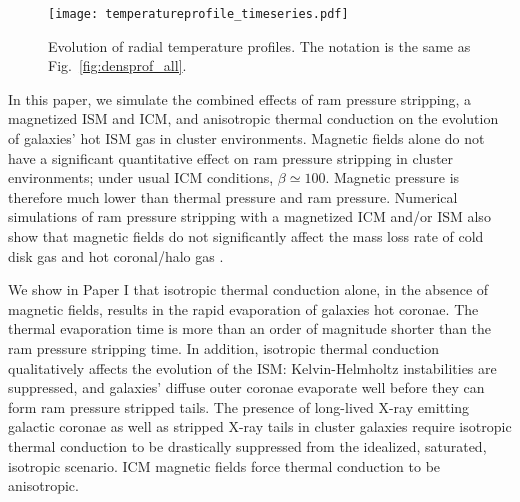\documentclass[twocolumn]{aastex6}
\begin{document}
\begin{figure*}[!htbp]
  \begin{center}
    {\texttt{[image: temperatureprofile\_timeseries.pdf]}}
     \caption{Evolution of radial temperature profiles. The notation is the same as Fig.~\ref{fig:densprof_all}.
      \label{fig:tempprof_all}}
  \end{center}  
\end{figure*}

In this paper, we simulate the combined effects of ram pressure stripping, a magnetized ISM and ICM, and anisotropic thermal conduction on the evolution of galaxies' hot ISM gas in cluster environments. Magnetic fields alone do not have a significant quantitative effect on ram pressure stripping in cluster environments; under usual ICM conditions, $\beta \simeq 100$. Magnetic pressure is therefore much lower than thermal pressure and ram pressure. Numerical simulations of ram pressure stripping with a magnetized ICM and/or ISM also show that magnetic fields do not significantly affect the mass loss rate of cold disk gas \citep{Ruszkowski14,Tonnesen14} and hot coronal/halo gas \citep{Shin14,Vijayaraghavan17a}. 

We show in Paper I that isotropic thermal conduction alone, in the absence of magnetic fields, results in the rapid evaporation of galaxies hot coronae. The thermal evaporation time is more than an order of magnitude shorter than the ram pressure stripping time. In addition, isotropic thermal conduction qualitatively affects the evolution of the ISM: Kelvin-Helmholtz instabilities are suppressed, and galaxies' diffuse outer coronae evaporate well before they can form ram pressure stripped tails. The presence of long-lived X-ray emitting galactic coronae as well as stripped X-ray tails in cluster galaxies require isotropic thermal conduction to be drastically suppressed from the idealized, saturated, isotropic scenario. ICM magnetic fields force thermal conduction to be anisotropic.
\end{document}
